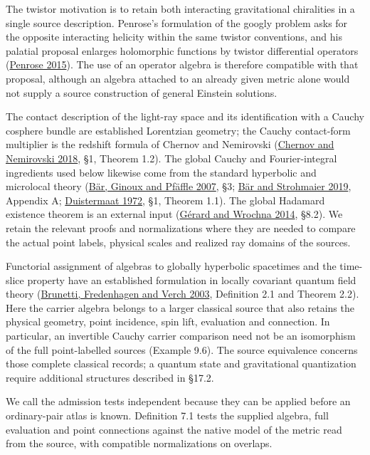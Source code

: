 \documentclass[
  english,
  11pt,
  reqno]{amsart}
\begin{document}
The twistor motivation is to retain both interacting gravitational
chiralities in a single source description. Penrose's formulation of the
googly problem asks for the opposite interacting helicity within the
same twistor conventions, and his palatial proposal enlarges holomorphic
functions by twistor differential operators
(\hyperref[ref-Penrose2015]{Penrose 2015}). The use of an operator
algebra is therefore compatible with that proposal, although an algebra
attached to an already given metric alone would not supply a source
construction of general Einstein solutions.

The contact description of the light-ray space and its identification
with a Cauchy cosphere bundle are established Lorentzian geometry; the
Cauchy contact-form multiplier is the redshift formula of Chernov and
Nemirovski (\hyperref[ref-ChernovNemirovski2018]{Chernov and Nemirovski
2018}, §1, Theorem 1.2). The global Cauchy and Fourier-integral
ingredients used below likewise come from the standard hyperbolic and
microlocal theory (\hyperref[ref-BarGinouxPfaeffle2007]{Bär, Ginoux and
Pfäffle 2007}, §3; \hyperref[ref-BarStrohmaier2019]{Bär and Strohmaier
2019}, Appendix A; \hyperref[ref-Duistermaat1972]{Duistermaat 1972}, §1,
Theorem 1.1). The global Hadamard existence theorem is an external input
(\hyperref[ref-GerardWrochna2014]{Gérard and Wrochna 2014}, §8.2). We
retain the relevant proofs and normalizations where they are needed to
compare the actual point labels, physical scales and realized ray
domains of the sources.

Functorial assignment of algebras to globally hyperbolic spacetimes and
the time-slice property have an established formulation in locally
covariant quantum field theory
(\hyperref[ref-BrunettiFredenhagenVerch2003]{Brunetti, Fredenhagen and
Verch 2003}, Definition 2.1 and Theorem 2.2). Here the carrier algebra
belongs to a larger classical source that also retains the physical
geometry, point incidence, spin lift, evaluation and connection. In
particular, an invertible Cauchy carrier comparison need not be an
isomorphism of the full point-labelled sources (Example 9.6). The source
equivalence concerns those complete classical records; a quantum state
and gravitational quantization require additional structures described
in §17.2.

We call the admission tests independent because they can be applied
before an ordinary-pair atlas is known. Definition 7.1 tests the
supplied algebra, full evaluation and point connections against the
native model of the metric read from the source, with compatible
normalizations on overlaps.
\end{document}
